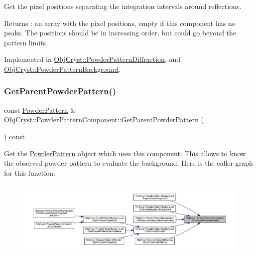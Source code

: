 Get the pixel positions separating the integration intervals around reflections.

\begin{DoxyReturn}{Returns}
\+: an array with the pixel positions, empty if this component has no peaks. The positions should be in increasing order, but could go beyond the pattern limits. 
\end{DoxyReturn}


Implemented in \mbox{\hyperlink{class_obj_cryst_1_1_powder_pattern_diffraction_a9d2ea6f73a2a65a3d5eec0bc892a976f}{Obj\+Cryst\+::\+Powder\+Pattern\+Diffraction}}, and \mbox{\hyperlink{class_obj_cryst_1_1_powder_pattern_background_ae75d135c8faa3aa4e0d7e145d848e8a1}{Obj\+Cryst\+::\+Powder\+Pattern\+Background}}.

\mbox{\label{class_obj_cryst_1_1_powder_pattern_component_a7428c062c1cb6d5f21d1e4131a917199}} 
\subsubsection{\texorpdfstring{GetParentPowderPattern()}{GetParentPowderPattern()}\hspace{0.1cm}{\footnotesize\ttfamily [1/2]}}
{\footnotesize\ttfamily const \mbox{\hyperlink{class_obj_cryst_1_1_powder_pattern}{Powder\+Pattern}} \& Obj\+Cryst\+::\+Powder\+Pattern\+Component\+::\+Get\+Parent\+Powder\+Pattern (\begin{DoxyParamCaption}{ }\end{DoxyParamCaption}) const}

Get the \mbox{\hyperlink{class_obj_cryst_1_1_powder_pattern}{Powder\+Pattern}} object which uses this component. This allows to know the observed powder pattern to evaluate the background. Here is the caller graph for this function\+:
\nopagebreak
\begin{figure}[H]
\begin{center}
\leavevmode
\includegraphics[width=350pt]{class_obj_cryst_1_1_powder_pattern_component_a7428c062c1cb6d5f21d1e4131a917199_icgraph}
\end{center}
\end{figure}
\mbox{\label{class_obj_cryst_1_1_powder_pattern_component_af381cfddfcb2a21563c4e1c10fd9cf33}} 
